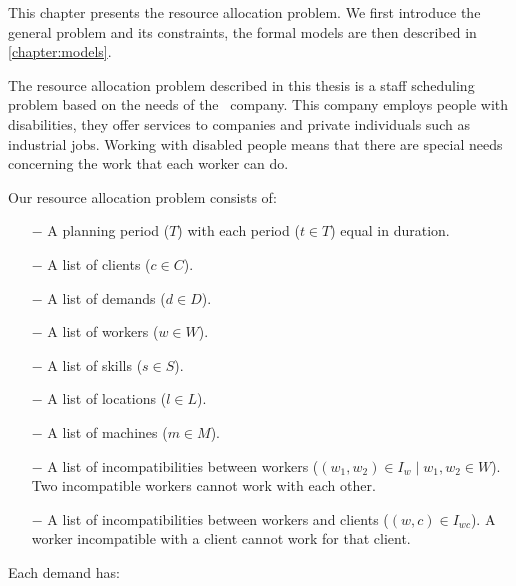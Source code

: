 \documentclass[../thesis.tex]{subfiles}
\begin{document}
This chapter presents the resource allocation problem.
We first introduce the general problem and its constraints, 
the formal models are then described in \autoref{chapter:models}.

The resource allocation problem described in this thesis is a staff scheduling problem based on the needs of the \vone\ company. 
This company employs people with disabilities, they offer services to companies and private individuals such 
as industrial jobs. Working with disabled people means that there are special needs concerning
the work that each worker can do.




Our resource allocation problem consists of:

\begin{itemize}
  \item[$-$] A planning period ($T$) with each period ($t \in T$) equal in duration.
  \item[$-$] A list of clients ($c \in C$). 
  \item[$-$] A list of demands ($d \in D$).
  \item[$-$] A list of workers ($w \in W$). 
  \item[$-$] A list of skills ($s \in S$).
  \item[$-$] A list of locations ($l \in L$).
  \item[$-$] A list of machines ($m \in M$).
  \item[$-$] A list of incompatibilities between workers ($(w_1, w_2) \in I_{w} \mid w_1, w_2 \in W$).
  Two incompatible workers cannot work with each other.  
  \item[$-$] A list of incompatibilities between workers and clients ($(w, c) \in I_{wc}$).
  A worker incompatible with a client cannot work for that client.
\end{itemize}

Each demand has:
\end{document}
